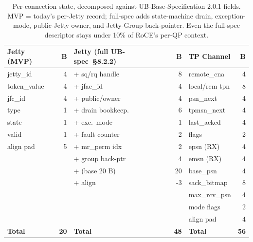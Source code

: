 \documentclass[10pt,twocolumn]{article}
\newcommand{\specsec}[1]{UB-spec~\S#1}
\begin{document}
\begin{table}[h]
  \centering
  \footnotesize
  \setlength{\tabcolsep}{4pt}
  \caption{Per-connection state, decomposed against
    UB-Base-Specification 2.0.1 fields. MVP = today's per-Jetty
    record; full-spec adds state-machine drain, exception-mode,
    public-Jetty owner, and Jetty-Group back-pointer. Even the
    full-spec descriptor stays under 10\% of RoCE's per-QP context.}
  \label{tab:state-decomp}
  \begin{tabular}{lr|lr|lr}
  \toprule
  Jetty (MVP) & B & Jetty (full \specsec{8.2.2}) & B & TP Channel & B \\
  \midrule
  jetty\_id        & 4  & + sq/rq handle    & 8  & remote\_cna   & 4  \\
  token\_value     & 4  & + jfae\_id        & 4  & local/rem tpn & 8  \\
  jfc\_id          & 4  & + public/owner    & 4  & psn\_next     & 4  \\
  type             & 1  & + drain bookkeep. & 6  & tpmsn\_next   & 4  \\
  state            & 1  & + exc.\ mode      & 1  & last\_acked   & 4  \\
  valid            & 1  & + fault counter   & 2  & flags         & 2  \\
  align pad        & 5  & + mr\_perm idx    & 2  & epsn (RX)     & 4  \\
                   &    & + group back-ptr  & 4  & emsn (RX)     & 4  \\
                   &    & + (base 20 B)     & 20 & base\_psn     & 4  \\
                   &    & + align           & -3 & sack\_bitmap  & 8  \\
                   &    &                   &    & max\_rcv\_psn & 4  \\
                   &    &                   &    & mode flags    & 2  \\
                   &    &                   &    & align pad     & 4  \\
  \midrule
  \textbf{Total}   & \textbf{20} & \textbf{Total} & \textbf{48} & \textbf{Total} & \textbf{56} \\
  \bottomrule
  \end{tabular}
\end{table}
\end{document}
